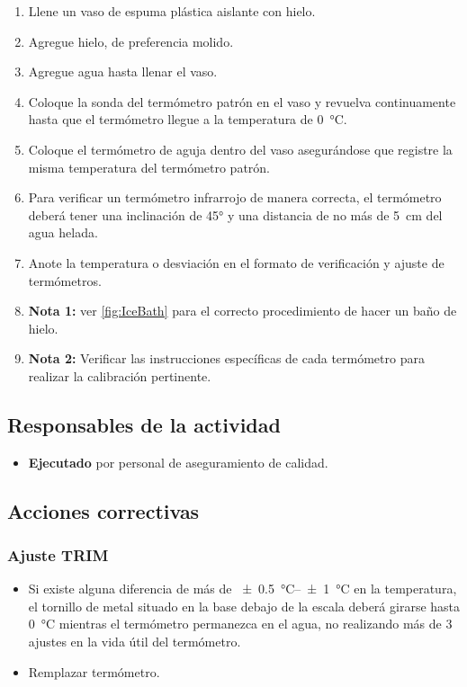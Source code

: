 \begin{enumerate}
	\item Llene un vaso de espuma plástica aislante con hielo.
	\item Agregue hielo, de preferencia molido.
	\item Agregue agua hasta llenar el vaso.
	\item Coloque la sonda del termómetro patrón en el vaso y revuelva continuamente hasta que el termómetro llegue a la temperatura de \qty{0}{\degreeCelsius}.
	\item Coloque el termómetro de aguja dentro del vaso asegurándose que registre la misma temperatura del termómetro patrón.
	\item Para verificar un termómetro infrarrojo de manera correcta, el termómetro deberá tener una inclinación de \ang{45} y una distancia de no más de \qty{5}{\centi\meter} del agua helada.
	\item Anote la temperatura o desviación en el formato de verificación y ajuste de termómetros.
	\item{\textbf{Nota 1:}} ver \cref{fig:IceBath} para el correcto procedimiento de hacer un baño de hielo.
    \item{\textbf{Nota 2:}} Verificar las instrucciones específicas de cada termómetro para realizar la calibración pertinente.
\end{enumerate}

\subsection{Responsables de la actividad}
\begin{itemize}
	\item \textbf{Ejecutado} por personal de aseguramiento de calidad.
\end{itemize}

\subsection{Acciones correctivas}
\subsubsection{Ajuste TRIM}
\begin{itemize}
	\item Si existe alguna diferencia de más de \qtyrange{+-0.5}{+-1}{\degreeCelsius} en la temperatura, el tornillo de metal situado en la base debajo de la escala deberá girarse hasta \qty{0}{\degreeCelsius} mientras el termómetro permanezca en el agua, no realizando más de 3 ajustes en la vida útil del termómetro.
	\item Remplazar termómetro.
\end{itemize}

